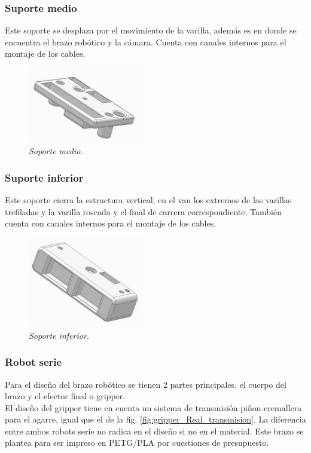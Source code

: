 \subsubsection{Suporte medio}
Este soporte se desplaza por el movimiento de la varilla, además es en donde se encuentra el brazo robótico y la cámara. Cuenta con canales internos para el montaje de los cables. \\
\begin{figure}[H]
    \centering
\includegraphics[width=0.45\textwidth]{img/medio.jpg} \par
    \caption{\textit{Soporte medio.}}
    \label{fig:soporte_medio}
\end{figure}

\subsubsection{Suporte inferior}
Este soporte cierra la estructura vertical, en el van los extremos de las varillas trefiladas y la varilla roscada y el final de carrera correspondiente. También cuenta con canales internos para el montaje de los cables. \\
\begin{figure}[H]
    \centering
\includegraphics[width=0.45\textwidth]{img/inferior_completo.jpg} \par
    \caption{\textit{Soporte inferior.}}
    \label{fig:soporte_inferior}
\end{figure}

\subsubsection{Robot serie}
Para el diseño del brazo robótico se tienen 2 partes principales, el cuerpo del brazo y el efector final o gripper. \\
El diseño del gripper tiene en cuenta un sistema de transmisión piñon-cremallera para el agarre, igual que el de la  fig. \ref{fig:gripper_Real_transmision}. La diferencia entre ambos robots serie no radica en el diseño si no en el material. Este brazo se plantea para ser impreso en PETG/PLA por cuestiones de presupuesto.\\

